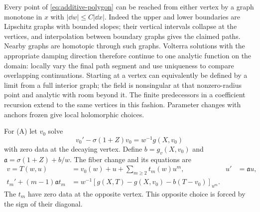 Every point of \eqref{eq:additive-polygon} can be reached from either
vertex by a graph monotone in $x$ with $|\dd w|\le C|\dd x|$.
Indeed the upper and lower boundaries are Lipschitz graphs with bounded
slopes; their vertical intervals collapse at the vertices, and
interpolation between boundary graphs gives the claimed paths.  Nearby
graphs are homotopic through such graphs.  Volterra solutions with the
appropriate damping direction therefore continue to one analytic
function on the domain: locally vary the final path segment and use
uniqueness to compare overlapping continuations.  Starting at a vertex
can equivalently be defined by a limit from a full interior graph;
the field is nonsingular at that nonzero-radius point and analytic with
room beyond it.  The finite predecessors in a coefficient recursion
extend to the same vertices in this fashion.  Parameter changes with
anchors frozen give local holomorphic choices.

For (A) let $v_0$ solve
\begin{equation}\label{eq:additive-graph}
 v_0'-\sigma(1+Z)v_0=w^{-1}g(X,v_0)
\end{equation}
with zero data at the decaying vertex.  Define
$b=g_v(X,v_0)$ and $\mathfrak a=\sigma(1+Z)+b/w$.
The fiber change and its equations are
\begin{align}
 v=T(w,u)&=v_0(w)+u+\sum_{m\ge2}t_m(w)u^m,
       &u'&=\mathfrak a u,\label{eq:additive-fiber}\\
 t_m'+(m-1)\mathfrak a t_m
   &=w^{-1}[g(X,T)-g(X,v_0)-b(T-v_0)]_{u^m}.
       \label{eq:additive-fiber-recursion}
\end{align}
The $t_m$ have zero data at the opposite vertex.  This opposite choice is
forced by the sign of their diagonal.


